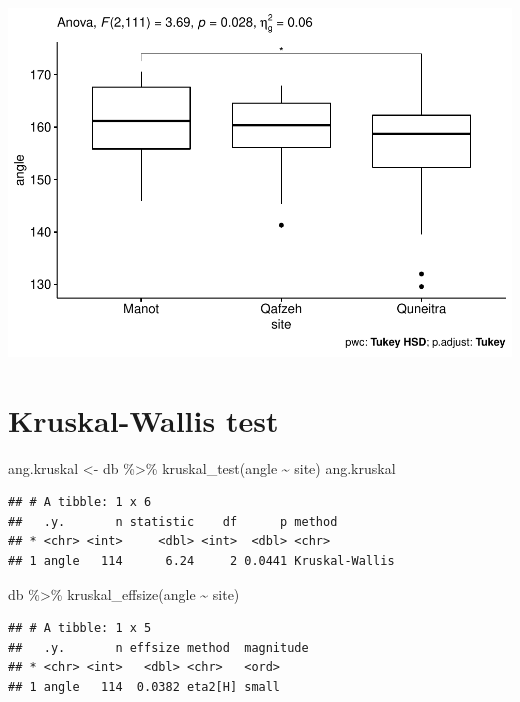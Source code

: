 \documentclass[
]{article}
\newenvironment{Shaded}{\begin{snugshade}}{\end{snugshade}}
\newcommand{\FunctionTok}[1]{\textcolor[rgb]{0.00,0.00,0.00}{#1}}
\newcommand{\NormalTok}[1]{#1}
\newcommand{\OtherTok}[1]{\textcolor[rgb]{0.56,0.35,0.01}{#1}}
\newcommand{\SpecialCharTok}[1]{\textcolor[rgb]{0.00,0.00,0.00}{#1}}
\begin{document}
\includegraphics{incisionangles_files/figure-latex/unnamed-chunk-6-4.pdf}

\hypertarget{kruskal-wallis-test}{%
\section{Kruskal-Wallis test}\label{kruskal-wallis-test}}

\begin{Shaded}
\begin{Highlighting}[]
\NormalTok{ang.kruskal }\OtherTok{\textless{}{-}}\NormalTok{ db }\SpecialCharTok{\%\textgreater{}\%} \FunctionTok{kruskal\_test}\NormalTok{(angle }\SpecialCharTok{\textasciitilde{}}\NormalTok{ site)}
\NormalTok{ang.kruskal}
\end{Highlighting}
\end{Shaded}

\begin{verbatim}
## # A tibble: 1 x 6
##   .y.       n statistic    df      p method        
## * <chr> <int>     <dbl> <int>  <dbl> <chr>         
## 1 angle   114      6.24     2 0.0441 Kruskal-Wallis
\end{verbatim}

\begin{Shaded}
\begin{Highlighting}[]
\NormalTok{db }\SpecialCharTok{\%\textgreater{}\%} \FunctionTok{kruskal\_effsize}\NormalTok{(angle }\SpecialCharTok{\textasciitilde{}}\NormalTok{ site)}
\end{Highlighting}
\end{Shaded}

\begin{verbatim}
## # A tibble: 1 x 5
##   .y.       n effsize method  magnitude
## * <chr> <int>   <dbl> <chr>   <ord>    
## 1 angle   114  0.0382 eta2[H] small
\end{verbatim}
\end{document}
